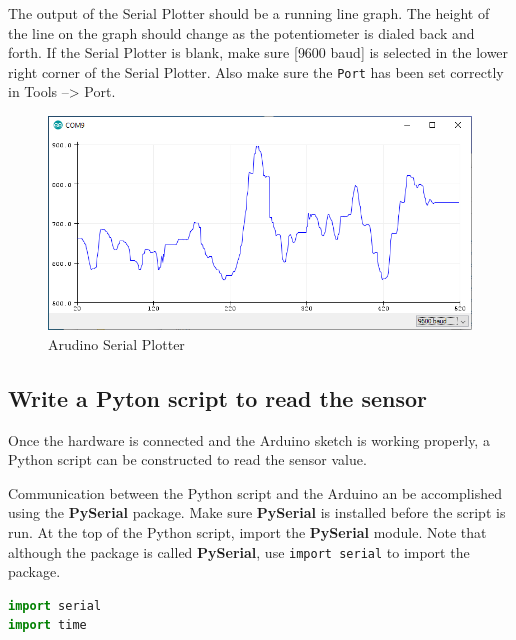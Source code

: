 \documentclass{book}
\makeatletter
\def\maxwidth{\ifdim\Gin@nat@width>\linewidth\linewidth
    \else\Gin@nat@width\fi}
\let\Oldincludegraphics\includegraphics
\renewcommand{\includegraphics}[1]{\Oldincludegraphics[width=.8\maxwidth]{#1}}
\makeatother
\begin{document}
The output of the Serial Plotter should be a running line graph. The
height of the line on the graph should change as the potentiometer is
dialed back and forth. If the Serial Plotter is blank, make sure {[}9600
baud{]} is selected in the lower right corner of the Serial Plotter.
Also make sure the \lstinline!Port! has been set correctly in Tools
--\textgreater{} Port.

\begin{figure}
\centering
\includegraphics{images/serial_plotter_output.png}
\caption{Arudino Serial Plotter}
\end{figure}
    




    
        \subsection{Write a Pyton script to read the
sensor}\label{write-a-pyton-script-to-read-the-sensor}
    




    
        Once the hardware is connected and the Arduino sketch is working
properly, a Python script can be constructed to read the sensor value.

Communication between the Python script and the Arduino an be
accomplished using the \textbf{PySerial} package. Make sure
\textbf{PySerial} is installed before the script is run. At the top of
the Python script, import the \textbf{PySerial} module. Note that
although the package is called \textbf{PySerial}, use
\lstinline!import serial! to import the package.
    




    
        \begin{lstlisting}[language=Python]
import serial
import time
\end{lstlisting}
    
\end{document}
